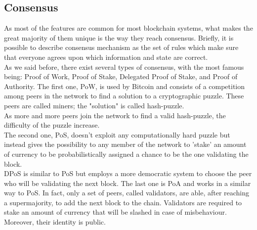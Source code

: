 \documentclass[mscthesis]{usiinfthesis}
\begin{document}
\subsection{Consensus}
As most of the features are common for most blockchain systems, what makes the great majority of them unique is the way they reach consensus. Briefly, it is possible to describe consensus mechanism as the set of rules which make sure that everyone agrees upon which information and state are correct. \\
As we said before, there exist several types of consensus, with the most famous being: Proof of Work, Proof of Stake, Delegated Proof of Stake, and Proof of Authority.
The first one, PoW, is used by Bitcoin and consists of a competition among peers in the network to find a solution to a cryptographic puzzle. These peers are called miners; the "solution" is called hash-puzzle. \\
As more and more peers join the network to find a valid hash-puzzle, the difficulty of the puzzle increase. \\
The second one, PoS, doesn't exploit any computationally hard puzzle but instead gives the possibility to any member of the network to 'stake' an amount of currency to be probabilistically assigned a chance to be the one validating the block. \\
DPoS is similar to PoS but employs a more democratic system to choose the peer who will be validating the next block. The last one is PoA and works in a similar way to PoS. In fact, only a set of peers, called validators, are able, after reaching a supermajority, to add the next block to the chain. Validators are required to stake an amount of currency that will be slashed in case of misbehaviour. Moreover, their identity is public.
\end{document}
